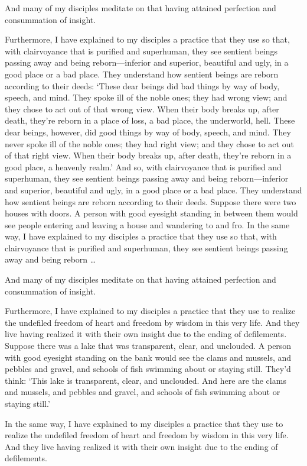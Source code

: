 \documentclass[12pt,openany]{book}%
\begin{document}
And many of my disciples meditate on that having attained perfection and consummation of insight. 

Furthermore, I have explained to my disciples a practice that they use so that, with clairvoyance that is purified and superhuman, they see sentient beings passing away and being reborn—inferior and superior, beautiful and ugly, in a good place or a bad place. They understand how sentient beings are reborn according to their deeds: ‘These dear beings did bad things by way of body, speech, and mind. They spoke ill of the noble ones; they had wrong view; and they chose to act out of that wrong view. When their body breaks up, after death, they’re reborn in a place of loss, a bad place, the underworld, hell. These dear beings, however, did good things by way of body, speech, and mind. They never spoke ill of the noble ones; they had right view; and they chose to act out of that right view. When their body breaks up, after death, they’re reborn in a good place, a heavenly realm.’ And so, with clairvoyance that is purified and superhuman, they see sentient beings passing away and being reborn—inferior and superior, beautiful and ugly, in a good place or a bad place. They understand how sentient beings are reborn according to their deeds. Suppose there were two houses with doors. A person with good eyesight standing in between them would see people entering and leaving a house and wandering to and fro. In the same way, I have explained to my disciples a practice that they use so that, with clairvoyance that is purified and superhuman, they see sentient beings passing away and being reborn … 

And many of my disciples meditate on that having attained perfection and consummation of insight. 

Furthermore, I have explained to my disciples a practice that they use to realize the undefiled freedom of heart and freedom by wisdom in this very life. And they live having realized it with their own insight due to the ending of defilements. Suppose there was a lake that was transparent, clear, and unclouded. A person with good eyesight standing on the bank would see the clams and mussels, and pebbles and gravel, and schools of fish swimming about or staying still. They’d think: ‘This lake is transparent, clear, and unclouded. And here are the clams and mussels, and pebbles and gravel, and schools of fish swimming about or staying still.’ 

In the same way, I have explained to my disciples a practice that they use to realize the undefiled freedom of heart and freedom by wisdom in this very life. And they live having realized it with their own insight due to the ending of defilements. 
\end{document}
